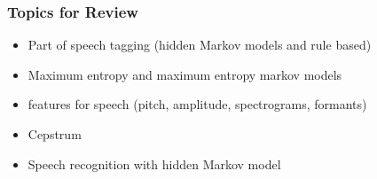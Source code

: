 \subsubsection*{Topics for Review}
\begin{itemize}
\item Part of speech tagging (hidden Markov models and rule based)
\item Maximum entropy and maximum entropy markov models
\item features for speech (pitch, amplitude, spectrograms, formants)
\item Cepstrum
\item Speech recognition with hidden Markov model
\end{itemize}
